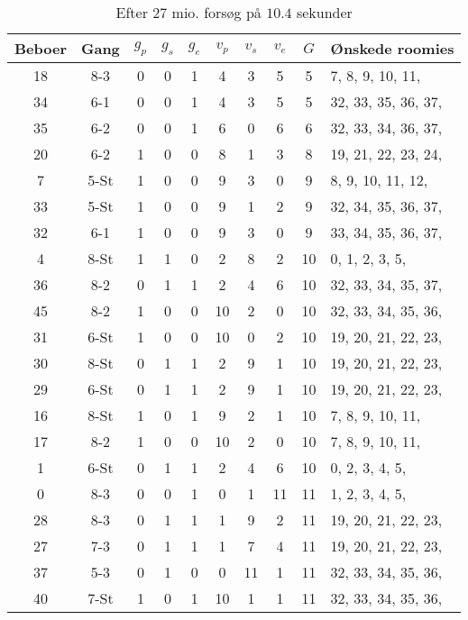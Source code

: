 \documentclass[article,oneside,11pt,a4paper]{memoir}
\newenvironment{assignment}[1]{
\begin{table}[h]
\caption{#1}
\footnotesize
\begin{center}
\begin{tabular}{cccccccccl}
\toprule
Beboer & Gang & $g_p$ & $g_s$ & $g_e$ & $v_p$ & $v_s$ & $v_e$ & $G$ & Ønskede roomies \\ \midrule
}{
\bottomrule
\end{tabular}
\end{center}
\end{table}

}
\begin{document}
\begin{assignment}{Efter 27 mio. forsøg på $10.4$ sekunder}
    18 & 8-3  &   0 &   0 &   1 &   4 &   3 &   5 &  5 &   7,  8,  9, 10, 11, \\
    34 & 6-1  &   0 &   0 &   1 &   4 &   3 &   5 &  5 &  32, 33, 35, 36, 37, \\
    35 & 6-2  &   0 &   0 &   1 &   6 &   0 &   6 &  6 &  32, 33, 34, 36, 37, \\
    20 & 6-2  &   1 &   0 &   0 &   8 &   1 &   3 &  8 &  19, 21, 22, 23, 24, \\
     7 & 5-St &   1 &   0 &   0 &   9 &   3 &   0 &  9 &   8,  9, 10, 11, 12, \\
    33 & 5-St &   1 &   0 &   0 &   9 &   1 &   2 &  9 &  32, 34, 35, 36, 37, \\
    32 & 6-1  &   1 &   0 &   0 &   9 &   3 &   0 &  9 &  33, 34, 35, 36, 37, \\
     4 & 8-St &   1 &   1 &   0 &   2 &   8 &   2 & 10 &   0,  1,  2,  3,  5, \\
    36 & 8-2  &   0 &   1 &   1 &   2 &   4 &   6 & 10 &  32, 33, 34, 35, 37, \\
    45 & 8-2  &   1 &   0 &   0 &  10 &   2 &   0 & 10 &  32, 33, 34, 35, 36, \\
    31 & 6-St &   1 &   0 &   0 &  10 &   0 &   2 & 10 &  19, 20, 21, 22, 23, \\
    30 & 8-St &   0 &   1 &   1 &   2 &   9 &   1 & 10 &  19, 20, 21, 22, 23, \\
    29 & 6-St &   0 &   1 &   1 &   2 &   9 &   1 & 10 &  19, 20, 21, 22, 23, \\
    16 & 8-St &   1 &   0 &   1 &   9 &   2 &   1 & 10 &   7,  8,  9, 10, 11, \\
    17 & 8-2  &   1 &   0 &   0 &  10 &   2 &   0 & 10 &   7,  8,  9, 10, 11, \\
     1 & 6-St &   0 &   1 &   1 &   2 &   4 &   6 & 10 &   0,  2,  3,  4,  5, \\
     0 & 8-3  &   0 &   0 &   1 &   0 &   1 &  11 & 11 &   1,  2,  3,  4,  5, \\
    28 & 8-3  &   0 &   1 &   1 &   1 &   9 &   2 & 11 &  19, 20, 21, 22, 23, \\
    27 & 7-3  &   0 &   1 &   1 &   1 &   7 &   4 & 11 &  19, 20, 21, 22, 23, \\
    37 & 5-3  &   0 &   1 &   0 &   0 &  11 &   1 & 11 &  32, 33, 34, 35, 36, \\
    40 & 7-St &   1 &   0 &   1 &  10 &   1 &   1 & 11 &  32, 33, 34, 35, 36, \\

\end{assignment}
\end{document}
